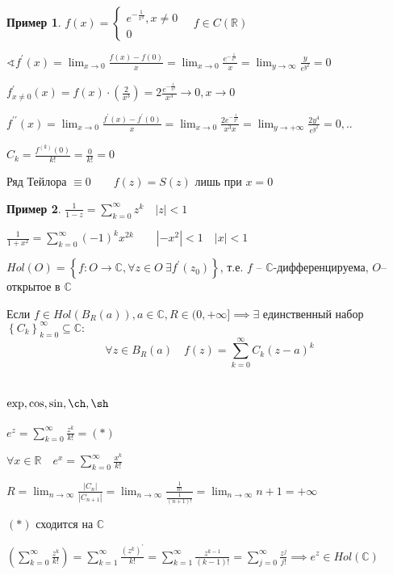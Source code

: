 \documentclass{book}
\newcommand\R{\ensuremath{\mathbb{R}}}
\renewcommand\C{\ensuremath{\mathbb{C}}}
\newcommand{\p}[1]{#1^{\prime}}
\newcommand{\pp}[1]{#1^{\prime\prime}}
\theoremstyle{definition}
\newtheorem*{example}{Пример}
\begin{document}
    \begin{example}
        $f(x) = \begin{cases}
            e^{-\frac{1}{x^2}}, x\neq 0\\
            0
        \end{cases}\quad f\in C(\R)$

        $\sphericalangle \p f(x) =\lim_{x \to 0} \frac{f(x) - f(0)}{x} = \lim_{x \to 0} \frac{e^{-\frac{1}{x^2}}}{x} = \lim_{y \to \infty } \frac{y}{e^{y^2}} = 0$

        $\p f_{x\neq 0}(x) = f(x) \cdot \left( \frac{2}{x^3} \right) =2 \frac{e^{-\frac{1}{x^2}}}{x^3} \to 0, x\to 0$

        $\pp f(x) = \lim_{x \to 0} \frac{\p f(x) - \p f(0)}{x} = \lim_{x \to 0} \frac{2e^{-\frac{1}{2^2}}}{x^3x} = \lim_{y \to +\infty } \frac{2y^4}{e^{y^2}} = 0, ..$ 

        $C_k = \frac{f^{(k)}(0)}{k!} = \frac{0}{k!} = 0$

        Ряд Тейлора $\equiv 0\qquad f\left( z \right) = S(z)$ лишь при $x = 0$      
    \end{example}

    \begin{example}
        $\frac{1}{1-z} = \sum_{k=0}^{\infty } z^k\quad |z| < 1$ 

        $\frac{1}{1+x^2} = \sum_{k=0}^{\infty } (-1)^kx^{2k}\qquad |-x^2|<1\quad |x|<1$
    \end{example}


    \begin{definition}
        $Hol(O) = \left\{ f:O\to \C, \forall z\in O\ \exists  \p f(z_0) \right\} $, т.е. $f$ --  $\C$-дифференцируема, $O$--открытое в  $\C$
    \end{definition}

    \begin{theorem}
        Если $f\in Hol\left( B_R(a) \right), a\in \C, R\in (0, +\infty ] \implies \exists  $ единственный набор $\left\{ C_k \right\} ^{\infty }_{k=0}\subseteq \C: $ \[\forall z\in B_R(a)\quad f(z) = \sum_{k=0}^{\infty } C_k(z-a)^k\]
    \end{theorem}

    \section{$\exp , \cos , \sin , \ch, \sh$}

    \begin{definition}
        $e^z = \sum_{k=0}^{\infty } \frac{z^k}{k!} = (*)$ 

        $\forall x\in \R\quad e^x = \sum_{k=0}^{\infty } \frac{x^k}{k!}$ 

        $R = \lim_{n \to \infty} \frac{|C_n|}{|C_{n+1}|} = \lim_{n \to \infty} \frac{\frac{1}{n!}}{\frac{1}{(n+1)!}} = \lim_{n \to \infty} n+1 = +\infty $

        $(*)$ сходится на  $\C$

        $\left( \sum_{k=0}^{\infty } \frac{z^k}{k!} \right)  = \sum_{k=1}^{\infty } \frac{\left( z^k \right) ^{\prime}}{k!} = \sum_{k=1}^{\infty } \frac{z^{k-1}}{(k-1)!} = \sum_{j=0}^{\infty } \frac{z^j}{j!} \implies e^z\in Hol(\C)$
    \end{definition}
\end{document}
